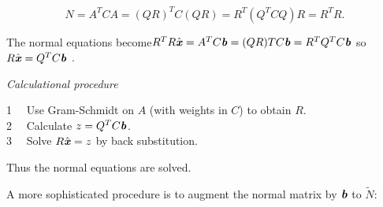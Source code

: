 $$ 
N=A^{T}CA=(QR)^{T}C(QR)=R^{T}(Q^{T}CQ)R=R^{T}R.
$$

\begin{flushleft}
	The normal equations become$R^{T}R\hat{\textbf{\textit{x}}}=A^{T}C\textbf{\textit{b}}=(QR)TC\textbf{\textit{b}}=R^{T}Q^{T}C\textbf{\textit{b}} $ so $ R\hat{\textbf{\textit{x}}}=Q^{T}C\textbf{\textit{b}}$ .
\end{flushleft}

\begin{flushleft}
	\textit{Calculational procedure}
\end{flushleft}
\begin{flushleft}
1 \ \      Use Gram-Schmidt on $A$ (with weights in $C$) to obtain $R$.\\
2 \ \      Calculate $z=Q^{T} C \textbf{\textit{b}}$.\\
3  \ \     Solve $R\hat{\textbf{\textit{x}}}= z$ by back substitution.
\end{flushleft}

\begin{flushleft}
	Thus the normal equations are solved.
\end{flushleft}

A more sophisticated procedure is to augment the normal matrix by $\textbf{\textit{b}}$ to $\tilde{N}$:

